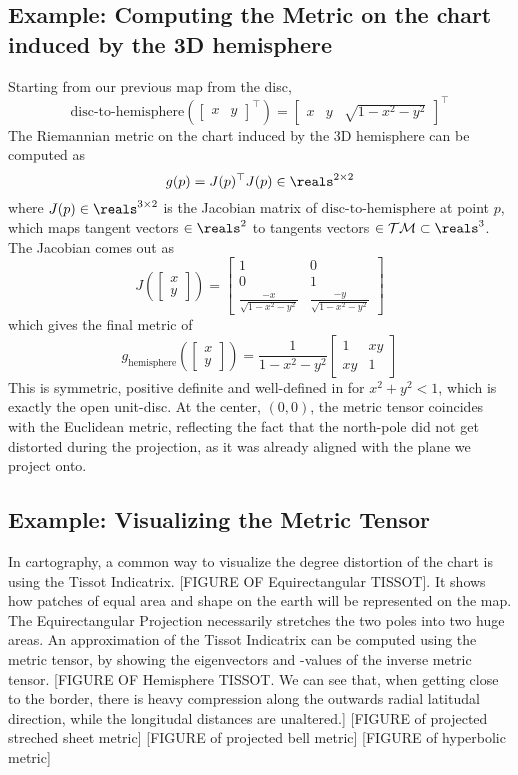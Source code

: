 \subsection{ Example: Computing the Metric on the chart induced by the 3D hemisphere}
Starting from our previous map from the disc,
$$\text{disc-to-hemisphere}(\begin{bmatrix}x & y\end{bmatrix}^\top) = \begin{bmatrix}x & y & \sqrt{1 - x^2 - y^2}\end{bmatrix}^\top $$ 
The Riemannian metric on the chart induced by the 3D hemisphere can be computed as 
$$g(p) = J(p)^\top J(p) \in \reals^{2\times 2}$$ 
where $J(p) \in \reals^{3\times 2}$ is the Jacobian matrix of $\text{disc-to-hemisphere}$ at point $p$, which maps tangent vectors $ \in \reals^2$ to tangents vectors $\in \mathcal{TM} \subset \reals^3$.
The Jacobian comes out as
$$ J\left(\begin{bmatrix}x \\ y \end{bmatrix}\right) = \begin{bmatrix}1 & 0 \\ 0 & 1 \\ \frac{-x}{\sqrt{1-x^2-y^2}} & \frac{-y}{\sqrt{1-x^2-y^2}}\end{bmatrix}$$
which gives the final metric of
$$g_{\text{hemisphere}}\left(\begin{bmatrix}x \\ y \end{bmatrix}\right)=\frac{1}{1-x^2-y^2} \begin{bmatrix} 1 & xy \\ xy & 1 \end{bmatrix}$$
This is symmetric, positive definite and well-defined in for $x^2+y^2 < 1$, which is exactly the open unit-disc. At the center, $(0,0)$, the metric tensor coincides with the Euclidean metric, reflecting the fact that the north-pole did not get distorted during the projection, as it was already aligned with the plane we project onto.

\subsection{ Example: Visualizing the Metric Tensor}
In cartography, a common way to visualize the degree distortion of the chart is using the Tissot Indicatrix. [FIGURE OF Equirectangular TISSOT]. It shows how patches of equal area and shape on the earth will be represented on the map. The Equirectangular Projection necessarily stretches the two poles into two huge areas. An approximation of the Tissot Indicatrix can be computed using the metric tensor, by showing the eigenvectors and -values of the inverse metric tensor. [FIGURE OF Hemisphere TISSOT. We can see that, when getting close to the border, there is heavy compression along the outwards radial latitudal direction, while the longitudal distances are unaltered.]
[FIGURE of projected streched sheet metric]
[FIGURE of projected bell metric]
[FIGURE of hyperbolic metric]


